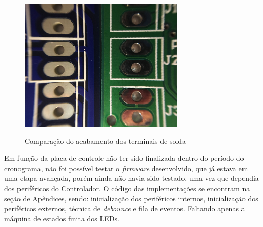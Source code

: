 \begin{figure}[H]
    \centering
    \caption{Comparação do acabamento dos terminais de solda}
    \includegraphics[width=0.7\textwidth]{./dados/figuras/comparacao-pads}
    \label{fig:comparacao-pads}
\end{figure}

Em função da placa de controle não ter sido finalizada dentro do período do cronograma, não foi possível testar o \emph{firmware} desenvolvido, que já estava em uma etapa avançada, porém ainda não havia sido testado, uma vez que dependia dos periféricos do Controlador. O código das implementações se encontram na seção de Apêndices, sendo: inicialização dos periféricos internos, inicialização dos periféricos externos, técnica de \emph{debounce} e fila de eventos. Faltando apenas a máquina de estados finita dos LEDs.
